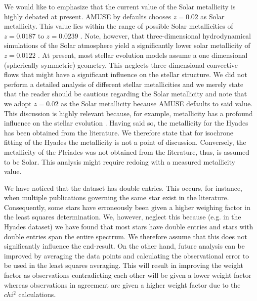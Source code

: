 \documentclass{aa}
\begin{document}
We would like to emphasize that the current value of the Solar metallicity is highly debated at present. AMUSE by defaults chooses $z = 0.02$ as Solar metallicity. This value lies within the range of possible Solar metallicities of $z= 0.0187$ to $z = 0.0239$ \citep{2007ApJ...670..872C}. Note, however, that three-dimensional hydrodynamical simulations of the Solar atmosphere yield a significantly lower solar metallicity of $z = 0.0122$ \citep{2006CoAst.147...76A}. At present, most stellar evolution models assume a one dimensional (spherically symmetric) geometry. This neglects three dimensional convective flows that might have a significant influence on the stellar structure. We did not perform a detailed analysis of different stellar metallicities and we merely state that the reader should be cautious regarding the Solar metallicity and note that we adopt $z = 0.02$ as the Solar metallicity because AMUSE defaults to said value. This discussion is highly relevant because, for example, metallicity has a profound influence on the stellar evolution \citep[e.g.][]{1960ApJ...131..598S}. Having said so, the metallicity for the Hyades has been obtained from the literature. We therefore state that for isochrone fitting of the Hyades the metallicity is not a point of discussion. Conversely, the metallicity of the Pleiades was not obtained from the literature, thus, is assumed to be Solar. This analysis might require redoing with a measured metallicity value.

We have noticed that the dataset has double entries. This occurs, for instance, when multiple publications governing the same star exist in the literature. Consequently, some stars have erroneously been given a higher weighing factor in the least squares determination.  We, however, neglect this because (e.g. in the Hyades dataset) we have found that most stars have double entries and stars with double entries span the entire spectrum. We therefore assume that this does not significantly influence the end-result. On the other hand, future analysis can be improved by averaging the data points and calculating the observational error to be used in the least squares averaging. This will result in improving the weight factor as observations contradicting each other will be given a lower weight factor whereas observations in agreement are given a higher weight factor due to the $chi^2$ calculations.
\end{document}
